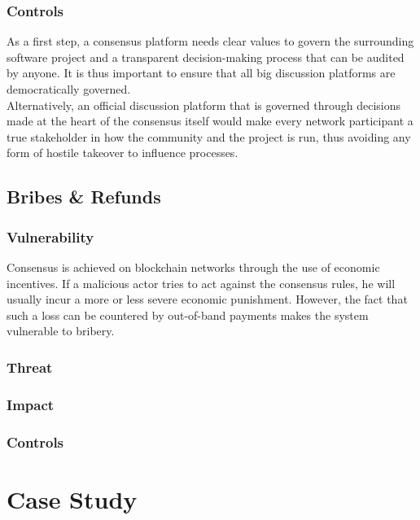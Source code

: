 \documentclass[11pt,a4paper,draft]{article}
\begin{document}
\subsubsection{Controls}

As a first step, a consensus platform needs clear values to govern the surrounding software project and a transparent decision-making process that can be audited by anyone. It is thus important to ensure that all big discussion platforms are democratically governed.\\

Alternatively, an official discussion platform that is governed through decisions made at the heart of the consensus itself would make every network participant a true stakeholder in how the community and the project is run, thus avoiding any form of hostile takeover to influence processes.\\

\subsection{Bribes \& Refunds}

\subsubsection{Vulnerability}

Consensus is achieved on blockchain networks through the use of economic incentives. If a malicious actor tries to act against the consensus rules, he will usually incur a more or less severe economic punishment. However, the fact that such a loss can be countered by out-of-band payments makes the system vulnerable to bribery.\\

\subsubsection{Threat}

\subsubsection{Impact}

\subsubsection{Controls}

\section{Case Study}
\end{document}
